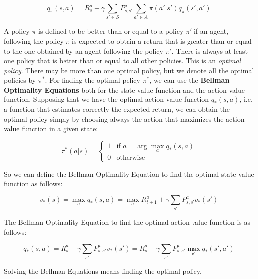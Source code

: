 \begin{equation}
    q_{\pi}(s, a) = R_s^a + \gamma \sum_{s' \in S} P_{s, s'}^a \sum_{a' \in A} \pi(a'|s')q_{\pi}(s', a')
\end{equation}



A policy $\pi$ is defined to be better than or equal to a policy $\pi'$ if an agent, following the policy $\pi$ is expected to obtain a return that is greater than or equal to the one obtained by an agent following the policy $\pi'$.
There is always at least one policy that is better than or equal to all other policies.
This is an \textit{optimal policy}.
There may be more than one optimal policy, but we denote all the optimal policies by $\pi^*$.
For finding the optimal policy $\pi^*$, we can use the \textbf{Bellman Optimality Equations} both for the state-value function and the action-value function.
Supposing that we have the optimal action-value function $q_*(s, a)$, i.e. a function that estimates correctly the expected return,
we can obtain the optimal policy simply by choosing always the action that maximizes the action-value function in a given state:

\begin{equation}
    \label{eq:optimal_policy}
    \pi^*(a|s) = \begin{cases}
        1 & \text{if } a = \arg\max_{a} q_*(s, a) \\
        0 & \text{otherwise}
    \end{cases}
\end{equation}


So we can define the Bellman Optimality Equation to find the optimal state-value function as follows:

\begin{equation} \label{eq:optimal_state_value}
    v_*(s) = \max_{a} q_*(s, a) = \max_{a} R_{t+1}^a + \gamma \sum_{s'} P_{s, s'}^a v_*(s')
\end{equation}

The Bellman Optimality Equation to find the optimal action-value function is as follows:

\begin{equation} \label{eq:optimal_action_value}
    q_*(s, a) = R_s^a + \gamma \sum_{s'} P_{s, s'}^a v_*(s') = R_s^a + \gamma \sum_{s'} P_{s, s'}^a \max_{a'} q_*(s', a')
\end{equation}


Solving the Bellman Equations means finding the optimal policy.


